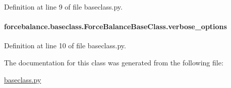 Definition at line 9 of file baseclass.\-py.

\hypertarget{classforcebalance_1_1baseclass_1_1ForceBalanceBaseClass_a8088e1e20cbd6bc175fb9c9fe9fa0f18}{
\paragraph[{verbose\-\_\-options}]{\setlength{\rightskip}{0pt plus 5cm}forcebalance.\-baseclass.\-Force\-Balance\-Base\-Class.\-verbose\-\_\-options}}\label{classforcebalance_1_1baseclass_1_1ForceBalanceBaseClass_a8088e1e20cbd6bc175fb9c9fe9fa0f18}


Definition at line 10 of file baseclass.\-py.



The documentation for this class was generated from the following file\-:\begin{DoxyCompactItemize}
\item 
\hyperlink{baseclass_8py}{baseclass.\-py}\end{DoxyCompactItemize}
